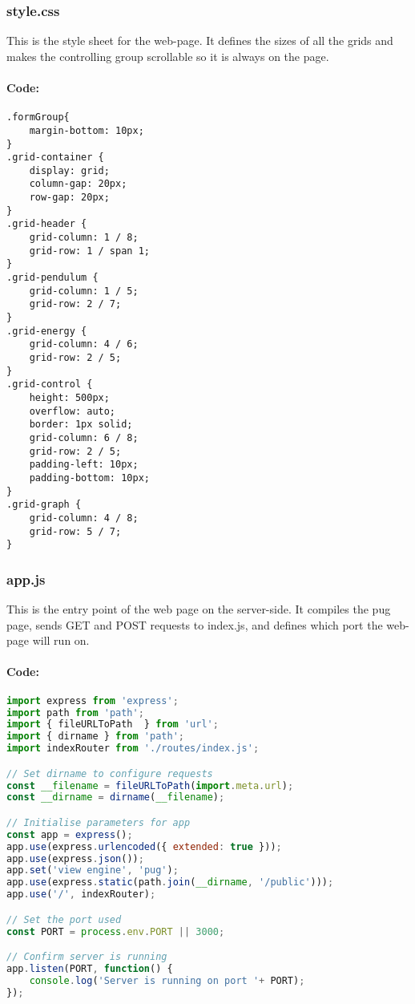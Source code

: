 \documentclass[12pt]{article}
\begin{document}
\subsubsection{style.css}
This is the style sheet for the web-page. It defines the sizes of all the grids and makes the controlling group scrollable so it is always on the page.
\paragraph{Code:}
\begin{lstlisting}
.formGroup{
    margin-bottom: 10px;
}
.grid-container {
    display: grid;
    column-gap: 20px;
    row-gap: 20px;
}
.grid-header {
    grid-column: 1 / 8;
    grid-row: 1 / span 1;
}
.grid-pendulum {
    grid-column: 1 / 5;
    grid-row: 2 / 7;
}
.grid-energy {
    grid-column: 4 / 6;
    grid-row: 2 / 5;
}
.grid-control {
    height: 500px;
    overflow: auto;
    border: 1px solid;
    grid-column: 6 / 8;
    grid-row: 2 / 5;
    padding-left: 10px;
    padding-bottom: 10px;
}
.grid-graph {
    grid-column: 4 / 8;
    grid-row: 5 / 7;
}
\end{lstlisting}



\subsubsection{app.js}
This is the entry point of the web page on the server-side. It compiles the pug page, sends GET and POST requests to index.js, and defines which port the web-page will run on.
\paragraph{Code:}
\begin{lstlisting}[language=JavaScript]
import express from 'express';
import path from 'path';
import { fileURLToPath  } from 'url';
import { dirname } from 'path';
import indexRouter from './routes/index.js';

// Set dirname to configure requests
const __filename = fileURLToPath(import.meta.url);
const __dirname = dirname(__filename);

// Initialise parameters for app
const app = express();
app.use(express.urlencoded({ extended: true }));
app.use(express.json());
app.set('view engine', 'pug');
app.use(express.static(path.join(__dirname, '/public')));
app.use('/', indexRouter);

// Set the port used
const PORT = process.env.PORT || 3000;

// Confirm server is running
app.listen(PORT, function() {
    console.log('Server is running on port '+ PORT);
});
\end{lstlisting}
\end{document}
